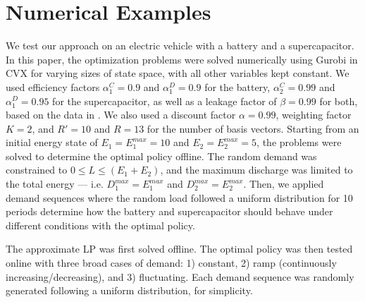 \documentclass[conference]{IEEEtran}
\begin{document}
\section{Numerical Examples}
We test our approach on an electric vehicle with a battery and a supercapacitor. In this paper, the optimization problems were solved numerically using Gurobi in CVX for varying sizes of state space, with all other variables kept constant. We used efficiency factors $\alpha^{C}_{1}=0.9$ and $\alpha^{D}_{1}=0.9$ for the battery, $\alpha^{C}_{2}=0.99$ and $\alpha^{D}_{1}=0.95$ for the supercapacitor, as well as a leakage factor of $\beta=0.99$ for both, based on the data in \cite{BattSupercapEff}. We also used a discount factor $\alpha=0.99$, weighting factor $K=2$, and $R'=10$ and $R=13$ for the number of basis vectors. Starting from an initial energy state of $E_{1}=E_{1}^{max}=10$ and $E_{2}=E_{2}^{max}=5$, the problems were solved to determine the optimal policy offline. The random demand was constrained to $0\leq L \leq (E_{1}+E_{2})$, and the maximum discharge was limited to the total energy --- i.e. $D_{1}^{max}=E_{1}^{max}$ and $D_{2}^{max}=E_{2}^{max}$. Then, we applied demand sequences where the random load followed a uniform distribution for 10 periods determine how the battery and supercapacitor should behave under different conditions with the optimal policy.

The approximate LP was first solved offline. The optimal policy was then tested online with three broad cases of demand: 1) constant, 2) ramp (continuously increasing/decreasing), and 3) fluctuating. Each demand sequence was randomly generated following a uniform distribution, for simplicity. %
\end{document}
